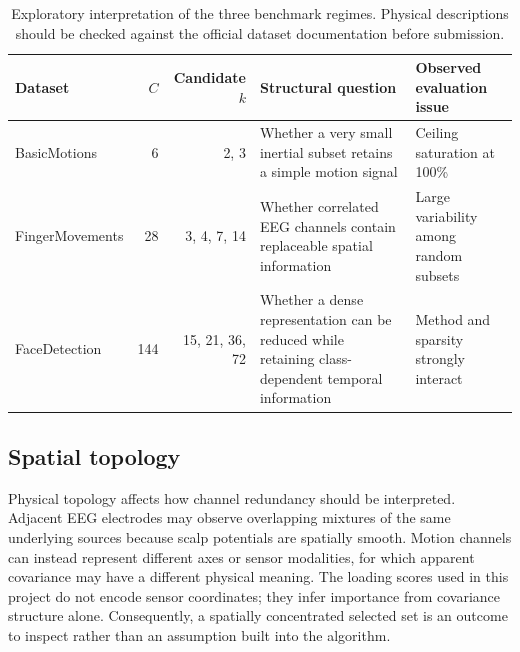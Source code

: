 \begin{table}[htbp]
\centering
\caption{Exploratory interpretation of the three benchmark regimes. Physical descriptions should be checked against the official dataset documentation before submission.}
\label{tab:eda-regimes}
\begin{tabularx}{\textwidth}{@{}p{30mm}rrYY@{}}
\toprule
Dataset & $C$ & Candidate $k$ & Structural question & Observed evaluation issue\\
\midrule
BasicMotions & 6 & 2, 3 & Whether a very small inertial subset retains a simple motion signal & Ceiling saturation at 100\%\\
FingerMovements & 28 & 3, 4, 7, 14 & Whether correlated EEG channels contain replaceable spatial information & Large variability among random subsets\\
FaceDetection & 144 & 15, 21, 36, 72 & Whether a dense representation can be reduced while retaining class-dependent temporal information & Method and sparsity strongly interact\\
\bottomrule
\end{tabularx}
\end{table}

\subsection{Spatial topology}
Physical topology affects how channel redundancy should be interpreted. Adjacent EEG electrodes may observe overlapping mixtures of the same underlying sources because scalp potentials are spatially smooth. Motion channels can instead represent different axes or sensor modalities, for which apparent covariance may have a different physical meaning. The loading scores used in this project do not encode sensor coordinates; they infer importance from covariance structure alone. Consequently, a spatially concentrated selected set is an outcome to inspect rather than an assumption built into the algorithm.

